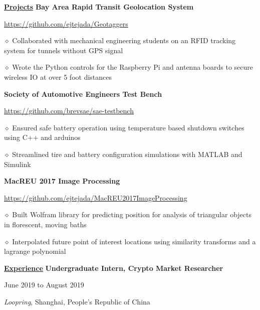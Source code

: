 \documentclass [11pt]{article}
\begin{document}
\begin{flushleft}
\underline{\textbf{Projects}}
\linebreak
\textbf{Bay Area Rapid Transit Geolocation System}\begin{minipage}{0.61 \linewidth}\begin{flushright}\href{https://github.com/ejtejada/Geotaggers}{https://github.com/ejtejada/Geotaggers}\end{flushright}\end{minipage}

‭‭\quad\quad\quad$\diamond$ Collaborated with mechanical engineering students on an RFID tracking system for tunnels without GPS signal

‭‭\quad\quad\quad$\diamond$ Wrote the Python controls for the Raspberry Pi and antenna boards to secure wireless IO at over 5 foot distances

\textbf{Society of Automotive Engineers Test Bench}\begin{minipage}{0.61 \linewidth}\begin{flushright}\href{https://github.com/brevsae/sae-testbench}{https://github.com/brevsae/sae-testbench}\end{flushright}\end{minipage}

‭‭\quad\quad\quad$\diamond$ Ensured safe battery operation using temperature based shutdown switches using C++ and arduinos

‭‭\quad\quad\quad$\diamond$ Streamlined tire and battery configuration simulations with MATLAB and Simulink

\textbf{MacREU 2017 Image Processing}\begin{minipage}{0.71 \linewidth}\begin{flushright}\href{https://github.com/ejtejada/MacREU2017ImageProcessing}{https://github.com/ejtejada/MacREU2017ImageProcessing}\end{flushright}\end{minipage}

‭‭\quad\quad\quad$\diamond$ ‭Built Wolfram library for predicting position for analysis of triangular objects in florescent, moving baths

‭‭\quad\quad\quad$\diamond$ Interpolated future point of interest locations using similarity transforms and a lagrange polynomial

\vspace{7}
\underline{\textbf{Experience}}
\linebreak
\textbf{Undergraduate Intern, Crypto Market Researcher}\begin{minipage}{0.55 \linewidth}\begin{flushright}June 2019 to August 2019\end{flushright}\end{minipage}
\emph{Loopring}, Shanghai, People's Republic of China


\end{flushleft}
\end{document}
